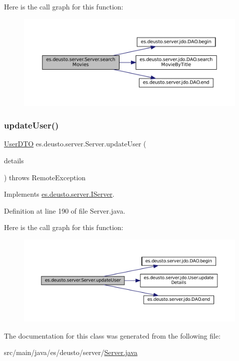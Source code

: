 Here is the call graph for this function\+:
\nopagebreak
\begin{figure}[H]
\begin{center}
\leavevmode
\includegraphics[width=350pt]{classes_1_1deusto_1_1server_1_1_server_a16789cc76edd46978ffbb58581caf5db_cgraph}
\end{center}
\end{figure}
\mbox{\label{classes_1_1deusto_1_1server_1_1_server_a74082f91af2065cd600c147296090921}} 
\subsubsection{\texorpdfstring{updateUser()}{updateUser()}}
{\footnotesize\ttfamily \mbox{\hyperlink{classes_1_1deusto_1_1server_1_1data_1_1_user_d_t_o}{User\+D\+TO}} es.\+deusto.\+server.\+Server.\+update\+User (\begin{DoxyParamCaption}\item[{\mbox{\hyperlink{classes_1_1deusto_1_1server_1_1data_1_1_user_details_d_t_o}{User\+Details\+D\+TO}}}]{details }\end{DoxyParamCaption}) throws Remote\+Exception}



Implements \mbox{\hyperlink{interfacees_1_1deusto_1_1server_1_1_i_server_aff376200af975b145ac85ccfdf48a229}{es.\+deusto.\+server.\+I\+Server}}.



Definition at line 190 of file Server.\+java.

Here is the call graph for this function\+:
\nopagebreak
\begin{figure}[H]
\begin{center}
\leavevmode
\includegraphics[width=350pt]{classes_1_1deusto_1_1server_1_1_server_a74082f91af2065cd600c147296090921_cgraph}
\end{center}
\end{figure}


The documentation for this class was generated from the following file\+:\begin{DoxyCompactItemize}
\item 
src/main/java/es/deusto/server/\mbox{\hyperlink{_server_8java}{Server.\+java}}\end{DoxyCompactItemize}
